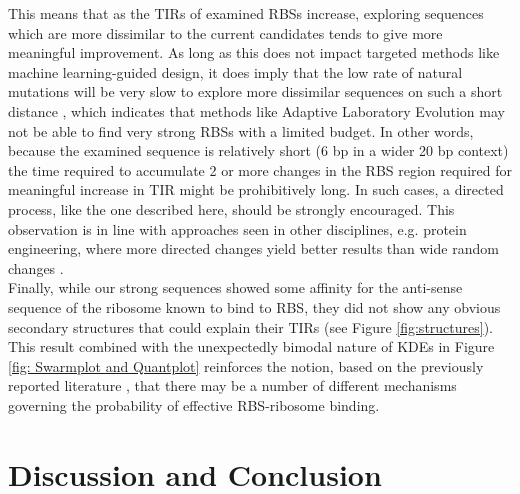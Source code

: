\documentclass{article}
\begin{document}
This means that as the TIRs of examined RBSs increase, exploring sequences which are more dissimilar to the current candidates tends to give more meaningful improvement.
As long as this does not impact targeted methods like machine learning-guided design, it does imply that the low rate of natural mutations will be very slow to explore more dissimilar sequences on such a short distance \cite{Lee2012}, which indicates that methods like Adaptive Laboratory Evolution may not be able to find very strong RBSs with a limited budget.
In other words, because the examined sequence is relatively short (6 bp in a wider 20 bp context) the time required to accumulate 2 or more changes in the RBS region required for meaningful increase in TIR might be prohibitively long.
In such cases, a directed process, like the one described here, should be strongly encouraged.
This observation is in line with approaches seen in other disciplines, e.g. protein engineering, where more directed changes yield better results than wide random changes \cite{Jackel2008}.\\

Finally, while our strong sequences showed some affinity for the anti-sense sequence of the ribosome known to bind to RBS, they did not show any obvious secondary structures that could explain their TIRs (see Figure \ref{fig:structures}).
This result combined with the unexpectedly bimodal nature of KDEs in Figure \ref{fig: Swarmplot and Quantplot} reinforces the notion, based on the previously reported literature \cite{Saito2020,EspahBorujeni2016}, that there may be a number of different mechanisms governing the probability of effective RBS-ribosome binding.\\



\section{Discussion and Conclusion}
\end{document}
